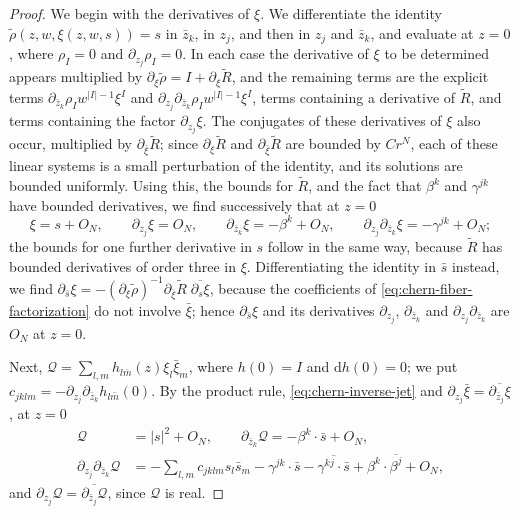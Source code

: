 \begin{proof}
We begin with the derivatives of $\xi$. We differentiate the identity $\tilde\rho(z,w,\xi(z,w,s))=s$ in $\bar z_k$, in $z_j$, and then in $z_j$ and $\bar z_k$, and evaluate at $z=0$, where $\rho_I=0$ and $\partial_{z_j}\rho_I=0$. In each case the derivative of $\xi$ to be determined appears multiplied by $\partial_\xi\tilde\rho=I+\partial_\xi\tilde R$, and the remaining terms are the explicit terms $\partial_{\bar z_k}\rho_Iw^{|I|-1}\xi^I$ and $\partial_{z_j}\partial_{\bar z_k}\rho_Iw^{|I|-1}\xi^I$, terms containing a derivative of $\tilde R$, and terms containing the factor $\partial_{z_j}\xi$. The conjugates of these derivatives of $\xi$ also occur, multiplied by $\partial_{\bar\xi}\tilde R$; since $\partial_\xi\tilde R$ and $\partial_{\bar\xi}\tilde R$ are bounded by $Cr^N$, each of these linear systems is a small perturbation of the identity, and its solutions are bounded uniformly. Using this, the bounds for $\tilde R$, and the fact that $\beta^k$ and $\gamma^{jk}$ have bounded derivatives, we find successively that at $z=0$
\begin{equation}\label{eq:chern-inverse-jet}
 \xi=s+O_N,\qquad\partial_{z_j}\xi=O_N,\qquad\partial_{\bar z_k}\xi=-\beta^k+O_N,\qquad\partial_{z_j}\partial_{\bar z_k}\xi=-\gamma^{jk}+O_N;
\end{equation}
the bounds for one further derivative in $s$ follow in the same way, because $\tilde R$ has bounded derivatives of order three in $\xi$. Differentiating the identity in $\bar s$ instead, we find $\partial_{\bar s}\xi=-(\partial_\xi\tilde\rho)^{-1}\partial_{\bar\xi}\tilde R\;\overline{\partial_s\xi}$, because the coefficients of \eqref{eq:chern-fiber-factorization} do not involve $\bar\xi$; hence $\partial_{\bar s}\xi$ and its derivatives $\partial_{z_j}$, $\partial_{\bar z_k}$ and $\partial_{z_j}\partial_{\bar z_k}$ are $O_N$ at $z=0$.

Next, $\mathcal Q=\sum_{l,m}h_{l\bar m}(z)\xi_l\bar\xi_m$, where $h(0)=I$ and $\mathrm dh(0)=0$; we put $c_{jklm}=-\partial_{z_j}\partial_{\bar z_k}h_{l\bar m}(0)$. By the product rule, \eqref{eq:chern-inverse-jet} and $\partial_{z_j}\bar\xi=\overline{\partial_{\bar z_j}\xi}$, at $z=0$
\begin{align*}
 \mathcal Q&=|s|^2+O_N,\qquad \partial_{\bar z_k}\mathcal Q=-\beta^k\cdot\bar s+O_N,\\
 \partial_{z_j}\partial_{\bar z_k}\mathcal Q&=-\sum_{l,m}c_{jklm}s_l\bar s_m-\gamma^{jk}\cdot\bar s-\overline{\gamma^{kj}\cdot\bar s}+\beta^k\cdot\overline{\beta^j}+O_N,
\end{align*}
and $\partial_{z_j}\mathcal Q=\overline{\partial_{\bar z_j}\mathcal Q}$, since $\mathcal Q$ is real.


\end{proof}
